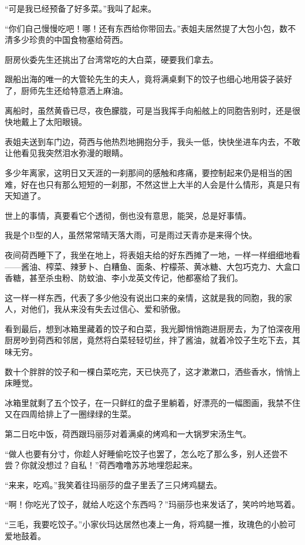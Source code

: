 \par “可是我已经预备了好多菜。”我叫了起来。
\par “你们自己慢慢吃吧！哪！还有东西给你带回去。”表姐夫居然提了大包小包，数不清多少珍贵的中国食物塞给荷西。
\par 厨房伙委先生还挑出了台湾常吃的大白菜，硬要我们拿去。
\par 跟船出海的唯一的大管轮先生的夫人，竟将满桌剩下的饺子也细心地用袋子装好了，厨师先生还给特意洒上麻油。
\par 离船时，虽然黄昏已尽，夜色朦胧，可是当我挥手向船舷上的同胞告别时，还是很快地戴上了太阳眼镜。
\par 表姐夫送到车门边，荷西与他热烈地拥抱分手，我头一低，快快坐进车内去，不敢让他看见我突然泪水弥漫的眼睛。
\par 多少年离家，这明日又天涯的一刹那间的感触和疼痛，要控制起来仍是相当的困难，好在也只有那么短短的一刹那，不然这世上大半的人会是什么情形，真是只有天知道了。
\par 世上的事情，真要看它个透彻，倒也没有意思，能哭，总是好事情。
\par 我是个B型的人，虽然常常晴天落大雨，可是雨过天青亦是来得个快。
\par 夜间荷西睡下了，我坐在地上，将表姐夫给的好东西摊了一地，一样一样细细地看——酱油、榨菜、辣萝卜、白糟鱼、面条、柠檬茶、黄冰糖、大包巧克力、大盒口香糖，甚至杀虫粉、防蚊油、李小龙英文传记，他都塞给了我们。
\par 这一样一样东西，代表了多少他没有说出口来的亲情，这就是我的同胞，我的家人，对他们，我从来没有失去过信心、爱和骄傲。
\par 看到最后，想到冰箱里藏着的饺子和白菜，我光脚悄悄跑进厨房去，为了怕深夜用厨房吵到荷西和邻居，竟然将白菜轻轻切丝，拌了酱油，就着冷饺子生吃下去，其味无穷。
\par 数十个胖胖的饺子和一棵白菜吃完，天已快亮了，这才漱漱口，洒些香水，悄悄上床睡觉。
\par 冰箱里就剩了五个饺子，在一只鲜红的盘子里躺着，好漂亮的一幅图画，我禁不住又在四周给排上了一圈绿绿的生菜。
\par 第二日吃中饭，荷西跟玛丽莎对着满桌的烤鸡和一大锅罗宋汤生气。
\par “做人也要有分寸，你趁人好睡偷吃饺子也罢了，怎么吃了那么多，别人还尝不尝？你就没想过？自私！”荷西噜噜苏苏地埋怨起来。
\par “来来，吃鸡。”我笑着往玛丽莎的盘子里丢了三只烤鸡腿去。
\par “啊！你吃光了饺子，就给人吃这个东西吗？”玛丽莎也来发话了，笑吟吟地骂着。
\par “三毛，我要吃饺子。”小家伙玛达居然也凑上一角，将鸡腿一推，玫瑰色的小脸可爱地鼓着。
